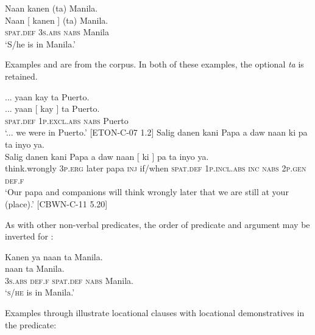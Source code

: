 \ea
\label{bkm:Ref429114698}
Naan  kanen (ta)  Manila. \\\smallskip
\gll Naan  [ kanen{ }]  (ta)  Manila. \\
\textsc{spat.def} {} 3\textsc{s.abs} \textsc{nabs}  Manila \\
\glt ‘S/he is in Manila.’
\z

Examples  and  are from the corpus. In both of these examples, the optional \textit{ta} is retained.

\ea
\label{ex:inpuerto}
... yaan  kay  ta  Puerto.  \\\smallskip
\gll ... yaan  [{ }kay{ }] ta  Puerto.  \\
{} \textsc{spat.def} 1\textsc{p.excl.abs}   \textsc{nabs}  Puerto \\
\glt ‘... we were in Puerto.’ [ETON-C-07 1.2]
\z
\ea
\label{ex:yourplace}
Salig  danen  kani  Papa  a  daw  naan  ki  pa  ta  inyo  ya. \\\smallskip
\gll Salig  danen  kani  Papa  a  daw  naan  [{ }ki{ }] pa  ta  inyo  ya. \\
think.wrongly  3\textsc{p.erg}  later  papa  \textsc{inj}  if/when  \textsc{spat.def}   1\textsc{p.incl.abs}  \textsc{inc}  \textsc{nabs}  2\textsc{p.gen}  \textsc{def.f} \\
\glt ‘Our papa and companions will think wrongly later that we are still at your (place).’ [CBWN-C-11 5.20]
\z

As with other non-verbal predicates, the order of predicate and argument may be inverted for :

\ea
Kanen  ya  naan  ta  Manila. \\\smallskip
\gll [ Kanen  ya{ }] naan  ta  Manila. \\
{} 3\textsc{s.abs}  \textsc{def.f} \textsc{spat.def}  \textsc{nabs}  Manila. \\
\glt ‘\textsc{s/he} is in Manila.’
\z

Examples  through  illustrate locational clauses with locational demonstratives in the predicate:

